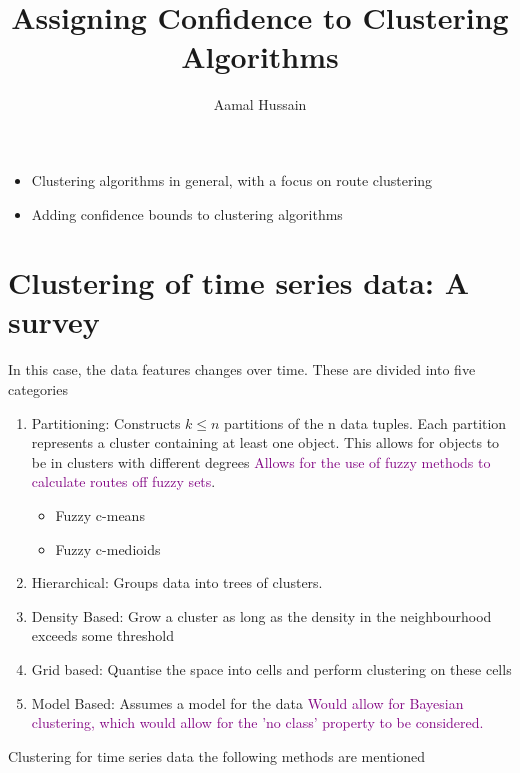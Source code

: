 \documentclass{report}
\title{Assigning Confidence to Clustering Algorithms}
\author{Aamal Hussain}
\newcommand\NOTE[1]{\textcolor{purple}{#1}}
\begin{document}
    \maketitle

    \begin{itemize}
        \item Clustering algorithms in general, with a focus on route clustering
        \item Adding confidence bounds to clustering algorithms
    \end{itemize}

    \section{Clustering of time series data: A survey}

    In this case, the data features changes over time. These are divided into five categories

    \begin{enumerate}
        \item Partitioning: Constructs $k \leq n$ partitions of the n data tuples. Each partition represents a cluster containing at least one object. This allows for objects to be in clusters with different degrees \NOTE{Allows for the use of fuzzy methods to calculate routes off fuzzy sets}.
        \begin{itemize}
            \item Fuzzy c-means
            \item Fuzzy c-medioids
        \end{itemize}
        \item Hierarchical: Groups data into trees of clusters. 
        \item Density Based: Grow a cluster as long as the density in the neighbourhood exceeds some threshold
        \item Grid based: Quantise the space into cells and perform clustering on these cells
        \item Model Based: Assumes a model for the data \NOTE{Would allow for Bayesian clustering, which would allow for the 'no class' property to be considered.} 
    \end{enumerate}

    Clustering for time series data the following methods are mentioned
\end{document}

